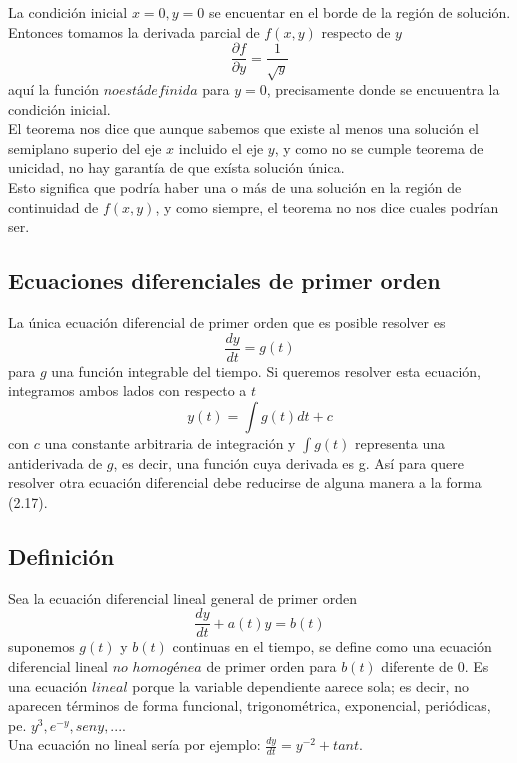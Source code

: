 \documentclass[10pt,a4paper,notitlepage]{report}
\begin{document}
\begin{itemize}
\begin{enumerate}
La condición inicial $x = 0, y = 0$ se encuentar en el borde de la región de solución. Entonces tomamos la derivada parcial de $f(x, y)$ respecto de $y$
\begin{equation}
\frac{\partial f}{\partial y} = \frac{1}{\sqrt{y}}
\end{equation}
aquí la función $no está definida$  para $y = 0$, precisamente donde se encuuentra la condición inicial. \\
El teorema nos dice que aunque sabemos que existe al menos una solución el semiplano superio del eje $x$ incluido el eje $y$, y como no se cumple teorema de unicidad, no hay garantía de que exísta solución única. \\
Esto significa que podría haber una o más de una solución en la región de continuidad de $f (x, y)$, y como siempre, el teorema no nos dice cuales podrían ser.

\end{enumerate}

\subsection{Ecuaciones diferenciales de primer orden}
La única ecuación diferencial de primer orden que es posible resolver es 
\begin{equation}
\frac{dy}{dt} = g(t)
\end{equation}
para $g$ una función integrable del tiempo. Si queremos resolver esta ecuación, integramos ambos lados con respecto a $t$
\begin{equation}
y(t) = \int g(t) dt + c
\end{equation}
con $c$ una constante arbitraria de integración y $\int g(t)$ representa una antiderivada de $g$, es decir, una función cuya derivada es g. Así para quere resolver otra ecuación diferencial debe reducirse de alguna manera a la forma (2.17).
\subsection*{Definición}
Sea la ecuación diferencial lineal general de primer orden
\begin{equation}
\frac{dy}{dt} + a(t)y = b(t)
\end{equation}
suponemos $g(t)$ y $b(t)$ continuas en el tiempo, se define como una ecuación diferencial lineal $no$ $homogénea$ de primer orden para $b(t )$ diferente de $0$. Es una ecuación $lineal$ porque la variable dependiente aarece sola; es decir, no aparecen términos de forma funcional, trigonométrica, exponencial, periódicas, pe. $y^{3}, e^{-y}, sen y, ...$.\\
Una ecuación no lineal sería por ejemplo: $\frac{dy}{dt} = y^{-2} + tan t$.\\

\end{itemize}
\end{document}
